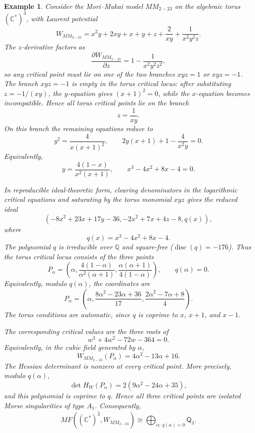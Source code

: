 \documentclass[11pt]{amsart}
\newtheorem{example}{Example}[section]
\newcommand{\MorseCat}[1]{\mathsf{Q}_{#1}}
\begin{document}
\begin{example}
Consider the Mori--Mukai model $MM_{2-23}$ on the algebraic torus
$(\mathbb{C}^*)^3$, with Laurent potential
\[
W_{MM_{2-23}}=x^2y+2xy+x+y+z+\frac{2}{xy}
+\frac{1}{x^2y^2z}.
\]
The $z$-derivative factors as
\[
\frac{\partial W_{MM_{2-23}}}{\partial z}
=1-\frac{1}{x^2y^2z^2},
\]
so any critical point must lie on one of the two branches $xyz=1$ or
$xyz=-1$. The branch $xyz=-1$ is empty in the torus critical locus: after
substituting $z=-1/(xy)$, the $y$-equation gives $(x+1)^2=0$, while the
$x$-equation becomes incompatible. Hence all torus critical points lie on the
branch
\[
z=\frac{1}{xy}.
\]
On this branch the remaining equations reduce to
\[
y^2=\frac{4}{x(x+1)^2},
\qquad
2y(x+1)+1-\frac{4}{x^2y}=0.
\]
Equivalently,
\[
y=\frac{4(1-x)}{x^2(x+1)},
\qquad
x^3-4x^2+8x-4=0.
\]

In reproducible ideal-theoretic form, clearing denominators in the logarithmic
critical equations and saturating by the torus monomial $xyz$ gives the reduced
ideal
\[
\left(
-8x^2+23x+17y-36,
-2x^2+7x+4z-8,
q(x)
\right),
\]
where
\[
q(x)=x^3-4x^2+8x-4.
\]
The polynomial $q$ is irreducible over $\mathbb{Q}$ and square-free
($\operatorname{disc}(q)=-176$). Thus the torus critical locus consists of the
three points
\[
P_{\alpha}=\left(
\alpha,
\frac{4(1-\alpha)}{\alpha^2(\alpha+1)},
\frac{\alpha(\alpha+1)}{4(1-\alpha)}
\right),
\qquad
q(\alpha)=0.
\]
Equivalently, modulo
$q(\alpha)$, the coordinates are
\[
P_{\alpha}=\left(
\alpha,
\frac{8\alpha^2-23\alpha+36}{17},
\frac{2\alpha^2-7\alpha+8}{4}
\right).
\]
The torus conditions are automatic, since $q$ is coprime to $x$, $x+1$, and
$x-1$.

The corresponding critical values are the three roots of
\[
w^3+4w^2-72w-364=0.
\]
Equivalently, in the cubic field generated by $\alpha$,
\[
W_{MM_{2-23}}(P_{\alpha})=4\alpha^2-13\alpha+16.
\]
The Hessian determinant is nonzero at every critical point. More precisely,
modulo $q(\alpha)$,
\[
\det H_W(P_{\alpha})=2(9\alpha^2-24\alpha+35),
\]
and this polynomial is coprime to $q$. Hence all three critical points are
isolated Morse singularities of type $A_1$. Consequently,
\[
\overline{MF((\mathbb{C}^*)^3,W_{MM_{2-23}})}
\cong \bigoplus_{\alpha:\,q(\alpha)=0}\MorseCat{3}.
\]
\end{example}
\end{document}

